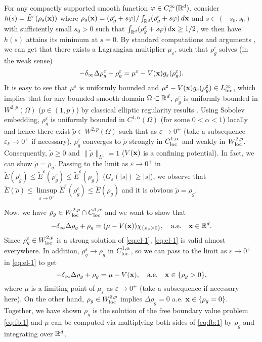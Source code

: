 \documentclass{elsarticle}
\newcommand{\vep}{\varepsilon}
\newcommand{\be}{\begin{equation}}
\newcommand{\ee}{\end{equation}}
\newcommand{\bx}{{\bf x} }
\begin{document}
For any compactly supported smooth function $\varphi\in C_c^\infty(\Bbb R^d)$, consider $h(s)=\tilde{E}^{\vep}(\rho_s(\bx))$ where
$\rho_s(\bx)=(\rho^\vep_g+s\varphi)/\int_{\Bbb R^d}(\rho^\vep_g+s\varphi)\,d\bx$ and $s\in(-s_0,s_0)$ with sufficiently small $s_0>0$ such that
$\int_{\Bbb R^d}(\rho^\vep_g+s\varphi)\,d\bx\ge 1/2$,
we then have $h(s)$ attains its minimum at $s=0$. By standard computations and arguments  \cite{Evans,LiebL}, we can get that there exists
a Lagrangian multiplier $\mu_\vep$, such that $\rho^\vep_g$ solves (in the weak sense)
\begin{equation}\label{eq:el-1}
-\delta_\infty\Delta\rho^\vep_g+\rho^\vep_g=\mu^\vep-V(\bx)g_\vep(\rho^\vep_g).
\end{equation}
It is easy to see that $\mu^\vep$ is uniformly bounded and $\mu^\vep-V(\bx)g_\vep(\rho^\vep_g)\in L_{\rm loc}^\infty$, which implies that  for
any bounded smooth domain $\Omega\subset\Bbb R^d$, $\rho_g^\vep$ is uniformly bounded in $W^{2,p}(\Omega)$  ($p\in(1,p)$) by classical elliptic regularity results \cite{Evans,LiebL}.
Using Sobolev embedding,
 $\rho_g^\vep$ is uniformly bounded in $C^{1,\alpha}(\Omega)$ (for some $0<\alpha<1$) locally and hence there exist $\tilde{\rho}\in W^{2,p}(\Omega)$ such that as $\vep\to0^+$ (take a subsequence
  $\vep_k\to0^+$ if necessary),
 $\rho_g^\vep$ converges to $\tilde{\rho}$ strongly in $C_{\rm loc}^{1,\alpha}$ and weakly in $W^{2,p}_{\rm loc}$. Consequently, $\tilde{\rho}\ge0$
 and $\|\tilde{\rho}\|_{L^1}=1$ ($V(\bx)$ is a confining potential).
 In fact, we can show $\tilde{\rho}=\rho_g$. Passing to the limit as $\vep\to0^+$ in $\tilde{E}(\rho_g^\vep)\leq\tilde{E}^\vep(\rho_g^\vep)\leq\tilde{E}^\vep(\rho_g)$ ($G_\vep(|s|)\ge |s|$),
 we  observe that
 $\tilde{E}(\tilde{\rho})\leq \limsup\limits_{\vep\to0^+}\tilde{E}^\vep(\rho_g^\vep)\leq\tilde{E}(\rho_g)$ and it is obvious $\tilde{\rho}=\rho_g$.

Now, we have $\rho_g\in W^{2,p}_{\rm loc}\cap C_{\rm loc}^{1,\alpha}$ and we want to show that
 \begin{equation}\label{eq:el-2}
-\delta_\infty\Delta\rho_g+\rho_g=(\mu-V(\bx))\chi_{\{\rho_g>0\}},\quad \text{a.e.} \quad\bx\in \Bbb R^d.
\end{equation}
Since $\rho^\vep_g\in W_{\rm loc}^{2,p}$ is a strong solution of \eqref{eq:el-1}, \eqref{eq:el-1} is valid almost everywhere. In addition, $\rho^\vep_g\to \rho_g$ in $C_{\rm loc}^{1,\alpha}$,
so we can pass to the limit as $\vep\to0^+$ in \eqref{eq:el-1} to get
\be
-\delta_\infty\Delta\rho_g+\rho_g=\mu-V(\bx),\quad \text{a.e.}\quad\bx\in\{\rho_g>0\},
\ee
where $\mu$ is a limiting point of $\mu_\vep$ as $\vep\to0^+$ (take a subsequence if necessary here).
On the other hand, $\rho_g\in W^{2,p}_{\rm loc}$ implies $\Delta \rho_g=0$ a.e. $\bx\in\{\rho_g=0\}$. Together, we have shown $\rho_g$ is the solution of the free boundary value problem
\eqref{eq:fb:1} and $\mu$ can be computed via multiplying both sides of \eqref{eq:fb:1} by $\rho_g$ and integrating over $\Bbb R^d$.
\end{document}
